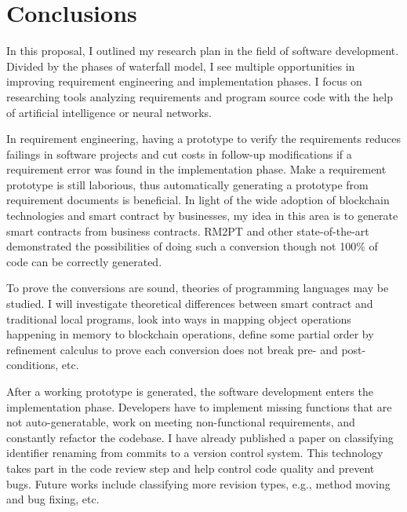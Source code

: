 \chapter{Conclusions}

In this proposal, I outlined my research plan in the field of software development.
Divided by the phases of waterfall model, I see multiple opportunities in improving requirement engineering and implementation phases.
I focus on researching tools analyzing requirements and program source code with the help of artificial intelligence or neural networks.

In requirement engineering, having a prototype to verify the requirements reduces failings in software projects and cut costs in follow-up modifications if a requirement error was found in the implementation phase. Make a requirement prototype is still laborious, thus automatically generating a prototype from requirement documents is beneficial.
In light of the wide adoption of blockchain technologies and smart contract by businesses, my idea in this area is to generate smart contracts from business contracts.
RM2PT and other state-of-the-art demonstrated the possibilities of doing such a conversion though not 100\% of code can be correctly generated.

To prove the conversions are sound, theories of programming languages may be studied. I will investigate theoretical differences between smart contract and traditional local programs,
look into ways in mapping object operations happening in memory to blockchain operations, define some partial order by refinement calculus to prove each conversion does not break pre- and post-conditions, etc.

After a working prototype is generated, the software development enters the implementation phase. Developers have to implement missing functions that are not auto-generatable, work on meeting non-functional requirements, and constantly refactor the codebase.
I have already published a paper on classifying identifier renaming from commits to a version control system.
This technology takes part in the code review step and help control code quality and prevent bugs.
Future works include classifying more revision types, e.g., method moving and bug fixing, etc.




